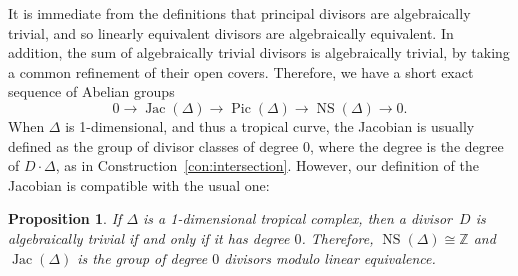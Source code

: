 \documentclass[11pt,reqno]{amsart}
\newtheorem{prop}[thm]{Proposition}
\theoremstyle{definition}
\newcommand{\isom}{\cong}
\newcommand{\Jac}{\operatorname{Jac}}
\newcommand{\NS}{\operatorname{NS}}
\newcommand{\Pic}{\operatorname{Pic}}
\newcommand{\ZZ}{\mathbb Z}
\begin{document}
It is immediate from the definitions that principal divisors are algebraically
trivial, and so linearly equivalent divisors are algebraically equivalent.
In addition, the sum of algebraically trivial divisors is algebraically trivial,
by taking a common refinement of their open covers.
Therefore, we have a short exact sequence of Abelian groups
\begin{equation}\label{eq:jac-pic-ns}
0 \rightarrow \Jac(\Delta) \rightarrow \Pic(\Delta) \rightarrow \NS(\Delta)
\rightarrow 0.
\end{equation}
When $\Delta$ is 1-dimensional, and thus a tropical curve, the Jacobian is
usually defined as the group of divisor classes of degree $0$, where the degree
is the degree of $D \cdot \Delta$, as in Construction~\ref{con:intersection}.
However, our definition of the Jacobian is compatible with the usual one:

\begin{prop}\label{p:alg-equiv-curve}
If $\Delta$ is a 1-dimensional tropical complex, then a divisor~$D$ is
algebraically trivial if and only if it has degree $0$. Therefore, $\NS(\Delta)
\isom \ZZ$ and $\Jac(\Delta)$ is the group of degree $0$ divisors modulo linear
equivalence.
\end{prop}
\end{document}
